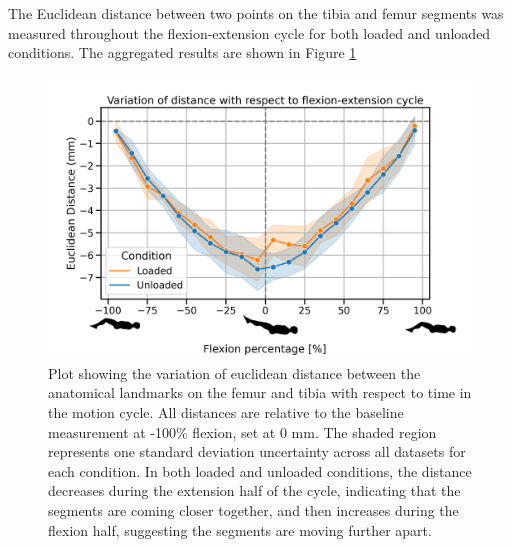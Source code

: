 \documentclass{micro-econ-thesis}
\begin{document}
The Euclidean distance between two points on the tibia and femur segments was measured throughout the flexion-extension cycle for both loaded and unloaded conditions. The aggregated results are shown in Figure \ref{fig:resultsdistancestickman}
\begin{figure}[H]
	\centering
	\includegraphics[width=0.7\linewidth]{distance_no_13_stick}
	\caption{Plot showing the variation of euclidean distance between the anatomical landmarks on the femur and tibia with respect to time in the motion cycle. All distances are relative to the baseline measurement at -100\% flexion, set at 0 mm. The shaded region represents one standard deviation uncertainty across all datasets for each condition. In both loaded and unloaded conditions, the distance decreases during the extension half of the cycle, indicating that the segments are coming closer together, and then increases during the flexion half, suggesting the segments are moving further apart.}
	\label{fig:resultsdistancestickman}
\end{figure}
\end{document}
